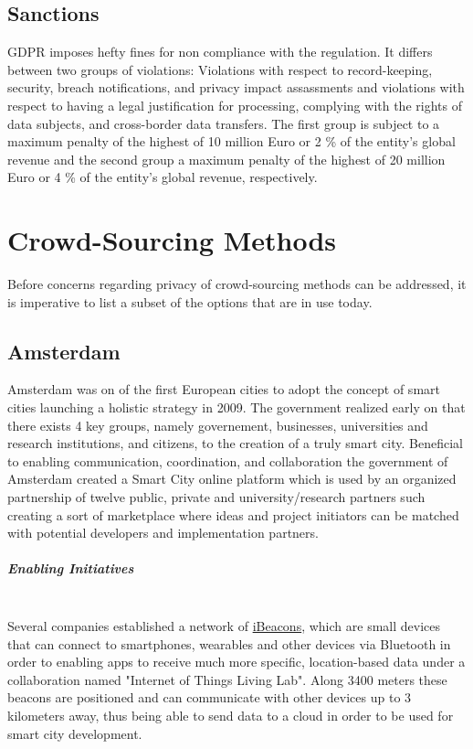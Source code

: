 \documentclass[a4paper,12pt]{report}
\begin{document}
	\section{Sanctions}
	\startsection
	GDPR imposes hefty fines for non compliance with the regulation.
	It differs between two groups of violations: Violations with respect to record-keeping, security, breach notifications, and privacy impact assassments and violations with respect to having a legal justification for processing, complying with the rights of data subjects, and cross-border data transfers.
	The first group is subject to a maximum penalty of the highest of 10 million Euro or 2 \% of the entity's global revenue and the second group a maximum penalty of the highest of 20 million Euro or 4 \% of the entity's global revenue, respectively.
	\closesection
	
	
	\chapter{Crowd-Sourcing Methods}
	Before concerns regarding privacy of crowd-sourcing methods can be addressed, it is imperative to list a subset of the options that are in use today.
	
	\section[Amsterdam]{Amsterdam \cite{SmartCityAmsterdam}} \label{Amsterdam}
	\startsection
		Amsterdam was on of the first European cities to adopt the concept of smart cities launching a holistic strategy in 2009. The government realized early on that there exists 4 key groups, namely governement, businesses, universities and research institutions, and citizens, to the creation of a truly smart city. Beneficial to enabling communication, coordination, and collaboration the government of Amsterdam created a Smart City online platform which is used by an organized partnership of twelve public, private and university/research partners such creating a sort of marketplace where ideas and project initiators can be matched with potential developers and implementation partners.
		\paragraph{Enabling Initiatives} \hfill \\
		Several companies established a network of \href{https://www.yenlo.com/blogs/ibeacon-testing-ground-first-lora-network/}{iBeacons}, which are small devices that can connect to smartphones, wearables and other devices via Bluetooth in order to enabling apps to receive much more specific, location-based data under a collaboration named "Internet of Things Living Lab". Along 3400 meters these beacons are positioned and can communicate with other devices up to 3 kilometers away, thus being able to send data to a cloud in order to be used for smart city development.
\end{document}
